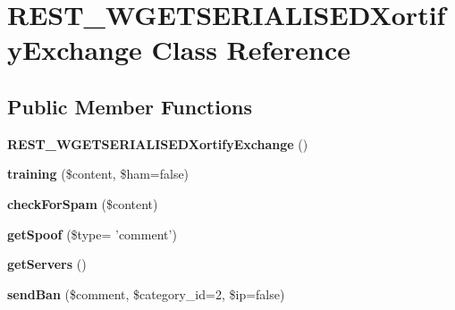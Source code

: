 \hypertarget{class_r_e_s_t___w_g_e_t_s_e_r_i_a_l_i_s_e_d_xortify_exchange}{\section{R\-E\-S\-T\-\_\-\-W\-G\-E\-T\-S\-E\-R\-I\-A\-L\-I\-S\-E\-D\-Xortify\-Exchange Class Reference}
\label{class_r_e_s_t___w_g_e_t_s_e_r_i_a_l_i_s_e_d_xortify_exchange}
}
\subsection*{Public Member Functions}
\begin{DoxyCompactItemize}
\item 
\hypertarget{class_r_e_s_t___w_g_e_t_s_e_r_i_a_l_i_s_e_d_xortify_exchange_a891093482d07e95b7e8927ae46ea5e4a}{{\bfseries R\-E\-S\-T\-\_\-\-W\-G\-E\-T\-S\-E\-R\-I\-A\-L\-I\-S\-E\-D\-Xortify\-Exchange} ()}\label{class_r_e_s_t___w_g_e_t_s_e_r_i_a_l_i_s_e_d_xortify_exchange_a891093482d07e95b7e8927ae46ea5e4a}

\item 
\hypertarget{class_r_e_s_t___w_g_e_t_s_e_r_i_a_l_i_s_e_d_xortify_exchange_a98bf1eed3b31bd227f3f052bd4bf2d2f}{{\bfseries training} (\$content, \$ham=false)}\label{class_r_e_s_t___w_g_e_t_s_e_r_i_a_l_i_s_e_d_xortify_exchange_a98bf1eed3b31bd227f3f052bd4bf2d2f}

\item 
\hypertarget{class_r_e_s_t___w_g_e_t_s_e_r_i_a_l_i_s_e_d_xortify_exchange_a8907fc8abb2965803a590e7077047705}{{\bfseries check\-For\-Spam} (\$content)}\label{class_r_e_s_t___w_g_e_t_s_e_r_i_a_l_i_s_e_d_xortify_exchange_a8907fc8abb2965803a590e7077047705}

\item 
\hypertarget{class_r_e_s_t___w_g_e_t_s_e_r_i_a_l_i_s_e_d_xortify_exchange_a8f388ae2dc39b9d0c5de45af71f56a38}{{\bfseries get\-Spoof} (\$type= 'comment')}\label{class_r_e_s_t___w_g_e_t_s_e_r_i_a_l_i_s_e_d_xortify_exchange_a8f388ae2dc39b9d0c5de45af71f56a38}

\item 
\hypertarget{class_r_e_s_t___w_g_e_t_s_e_r_i_a_l_i_s_e_d_xortify_exchange_a318466819247d152569cce053e5905d6}{{\bfseries get\-Servers} ()}\label{class_r_e_s_t___w_g_e_t_s_e_r_i_a_l_i_s_e_d_xortify_exchange_a318466819247d152569cce053e5905d6}

\item 
\hypertarget{class_r_e_s_t___w_g_e_t_s_e_r_i_a_l_i_s_e_d_xortify_exchange_a8b76dafc9d3c559b8df579778b7cecda}{{\bfseries send\-Ban} (\$comment, \$category\-\_\-id=2, \$ip=false)}\label{class_r_e_s_t___w_g_e_t_s_e_r_i_a_l_i_s_e_d_xortify_exchange_a8b76dafc9d3c559b8df579778b7cecda}


\end{DoxyCompactItemize}
